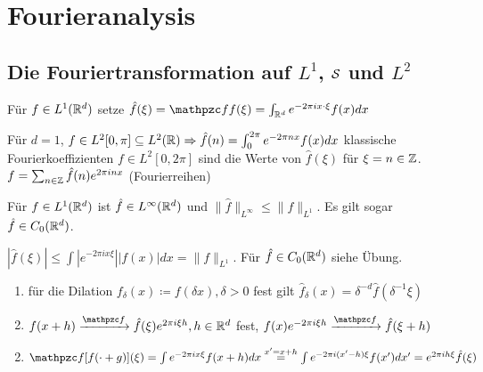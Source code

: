 \chapter*{Fourieranalysis} 

\setcounter{section}{2}

\section{Die Fouriertransformation auf $L^{1}$, $\mathcal{S}$ und $L^{2}$}



\begin{definition}
	Für $f \in L^{1}(\mathbb{R}^{d})$ setze $\hat{f}(\xi) = \ff f(\xi) = \int_{\R^{d}} e^{-2\pi i x \cdot \xi} f(x) dx$
\end{definition}


\begin{bemerkung*}
 	Für $d = 1$, $f \in L^{2}[0, \pi] \subseteq L^{2}(\mathbb{R}) \Rightarrow \hat{f}(n) = \int_{0}^{2\pi} e^{-2\pi n x} f(x) dx$ klassische Fourierkoeffizienten $f \in L^{2}[0, 2\pi]$ sind die Werte von $\hat{f}(\xi)$ für $\xi = n \in \mathbb{Z}$. $f = \sum_{n \in \mathbb{Z}} \hat{f}(n) e^{2\pi i n x}$ (Fourierreihen)
\end{bemerkung*}


\begin{prop}
	Für $f \in L^{1}(\mathbb{R}^{d})$ ist $\hat{f} \in L^{\infty}(\mathbb{R}^{d})$ und $\| \hat{f} \|_{L^{\infty}} \leq \| f\|_{L^{1}}$. Es gilt sogar $\hat{f} \in C_{0}(\mathbb{R}^{d})$.
\end{prop}

\begin{beweis}
	$|\hat{f}(\xi)| \leq \int |e^{-2\pi i x \xi}| |f(x)| dx = \| f \|_{L^{1}}$. Für $\hat{f} \in C_{0}(\mathbb{R}^{d})$ siehe Übung.
\end{beweis}


\begin{prop}
	\begin{enumerate}
		\item für die Dilation $f_{\delta}(x) \coloneqq f(\delta x), \delta > 0$ fest gilt $\hat{f}_{\delta}(x) = \delta^{-d} \hat{f}(\delta^{-1} \xi)$
		\item $f(x + h) \ft \hat{f}(\xi) e^{2\pi i \xi h}, h \in \R^{d}$ fest, $f(x)e^{-2\pi i \xi h} \ft \hat{f}(\xi + h)$
	\end{enumerate}
\end{prop}

\begin{beweis}
	\begin{enumerate}
		\setcounter{enumi}{1}
		\item $\ff[f(\cdot + g)](\xi) = \int e^{-2\pi i x \xi}f(x + h) dx \overset{x'=x+h}{=} \int e^{-2\pi i(x'-h) \xi} f(x') dx' = e^{2\pi ih\xi} \hat{f}(\xi)$
	\end{enumerate}
\end{beweis}


